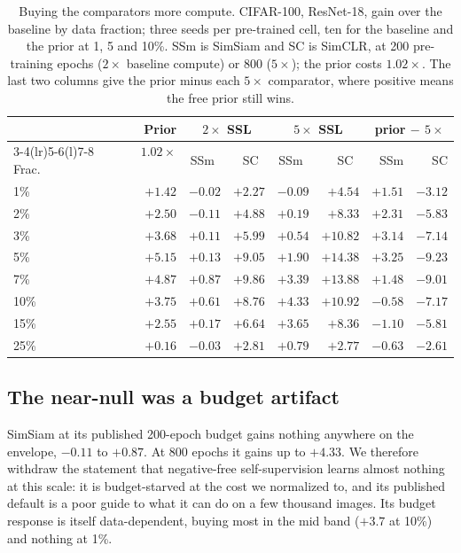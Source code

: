 \begin{table}[pos=htbp]
\caption{Buying the comparators more compute. CIFAR-100, ResNet-18, gain
over the baseline by data fraction; three seeds per pre-trained cell, ten
for the baseline and the prior at 1, 5 and 10\%. SSm is SimSiam and SC is
SimCLR, at 200 pre-training epochs ($2\times$ baseline compute) or 800
($5\times$); the prior costs $1.02\times$. The last two columns give the
prior minus each $5\times$ comparator, where positive
means the free prior still wins.}
\label{tab:budget}
\centering\scriptsize
\setlength{\tabcolsep}{2.6pt}
\begin{tabular}{lrrrrrrr}
\toprule
 & \textbf{Prior} & \multicolumn{2}{c}{$2\times$ SSL} & \multicolumn{2}{c}{$5\times$ SSL} & \multicolumn{2}{c}{prior $-$ $5\times$} \\
\cmidrule(lr){3-4}\cmidrule(lr){5-6}\cmidrule(l){7-8}
Frac. & $\mathbf{1.02\times}$~\up & SSm~\up & SC~\up & SSm~\up & SC~\up & SSm & SC \\
\midrule
1\%  & $+1.42$ & $-0.02$ & $+2.27$ & $-0.09$ & $\mathbf{+4.54}$ & $+1.51$ & $-3.12$ \\
2\%  & $+2.50$ & $-0.11$ & $+4.88$ & $+0.19$ & $\mathbf{+8.33}$ & $+2.31$ & $-5.83$ \\
3\%  & $+3.68$ & $+0.11$ & $+5.99$ & $+0.54$ & $\mathbf{+10.82}$ & $+3.14$ & $-7.14$ \\
5\%  & $+5.15$ & $+0.13$ & $+9.05$ & $+1.90$ & $\mathbf{+14.38}$ & $+3.25$ & $-9.23$ \\
7\%  & $+4.87$ & $+0.87$ & $+9.86$ & $+3.39$ & $\mathbf{+13.88}$ & $+1.48$ & $-9.01$ \\
10\% & $+3.75$ & $+0.61$ & $+8.76$ & $\mathbf{+4.33}$ & $\mathbf{+10.92}$ & $-0.58$ & $-7.17$ \\
15\% & $+2.55$ & $+0.17$ & $+6.64$ & $+3.65$ & $\mathbf{+8.36}$ & $-1.10$ & $-5.81$ \\
25\% & $+0.16$ & $-0.03$ & $+2.81$ & $+0.79$ & $\mathbf{+2.77}$ & $-0.63$ & $-2.61$ \\
\bottomrule
\end{tabular}
\end{table}

\subsection{The near-null was a budget artifact}\label{sec:budget:simsiam}
SimSiam at its published 200-epoch budget gains nothing anywhere on the
envelope, $-0.11$ to $+0.87$. At 800 epochs it gains up to $+4.33$. We
therefore withdraw the statement that negative-free self-supervision learns
almost nothing at this scale: it is budget-starved at the cost we normalized
to, and its published default is a poor guide to what it can do on a few
thousand images. Its budget response is itself data-dependent, 
buying most in the mid band ($+3.7$ at 10\%) and nothing at 1\%.

